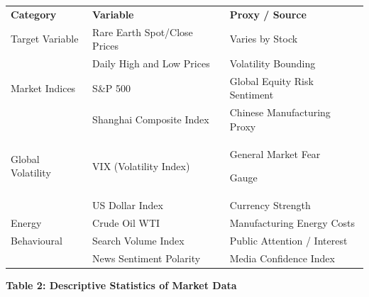 {\def\LTcaptype{none} %

\begin{longtable}[]{@{}

  >{\raggedright\arraybackslash}p{}

  >{\raggedright\arraybackslash}p{}

  >{\raggedright\arraybackslash}p{}@{}}

\toprule\noalign{}

\endhead

\bottomrule\noalign{}

\endlastfoot

\textbf{Category} & \textbf{Variable} & \textbf{Proxy / Source} \\

Target Variable & Rare Earth Spot/Close Prices & Varies by Stock \\

& Daily High and Low Prices & Volatility Bounding \\

Market Indices & S\&P 500 & Global Equity Risk Sentiment \\

& Shanghai Composite Index & Chinese Manufacturing Proxy \\

Global Volatility & VIX (Volatility Index) & General Market Fear

Gauge \\

& US Dollar Index & Currency Strength \\

Energy & Crude Oil WTI & Manufacturing Energy Costs \\

Behavioural & Search Volume Index & Public Attention / Interest \\

& News Sentiment Polarity & Media Confidence Index \\

\end{longtable}

}



\textbf{Table 2: Descriptive Statistics of Market Data}



